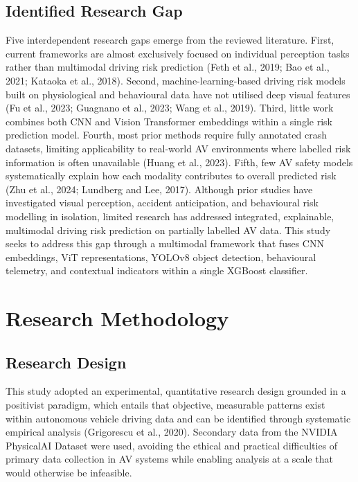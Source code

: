 \documentclass[11pt,a4paper]{article}
\begin{document}
\subsection{Identified Research Gap}

Five interdependent research gaps emerge from the reviewed literature. First, current frameworks are almost exclusively focused on individual perception tasks rather than multimodal driving risk prediction (Feth et al., 2019; Bao et al., 2021; Kataoka et al., 2018). Second, machine-learning-based driving risk models built on physiological and behavioural data have not utilised deep visual features (Fu et al., 2023; Guagnano et al., 2023; Wang et al., 2019). Third, little work combines both CNN and Vision Transformer embeddings within a single risk prediction model. Fourth, most prior methods require fully annotated crash datasets, limiting applicability to real-world AV environments where labelled risk information is often unavailable (Huang et al., 2023). Fifth, few AV safety models systematically explain how each modality contributes to overall predicted risk (Zhu et al., 2024; Lundberg and Lee, 2017). Although prior studies have investigated visual perception, accident anticipation, and behavioural risk modelling in isolation, limited research has addressed integrated, explainable, multimodal driving risk prediction on partially labelled AV data. This study seeks to address this gap through a multimodal framework that fuses CNN embeddings, ViT representations, YOLOv8 object detection, behavioural telemetry, and contextual indicators within a single XGBoost classifier.

\section{Research Methodology}

\subsection{Research Design}

This study adopted an experimental, quantitative research design grounded in a positivist paradigm, which entails that objective, measurable patterns exist within autonomous vehicle driving data and can be identified through systematic empirical analysis (Grigorescu et al., 2020). Secondary data from the NVIDIA PhysicalAI Dataset were used, avoiding the ethical and practical difficulties of primary data collection in AV systems while enabling analysis at a scale that would otherwise be infeasible.
\end{document}
